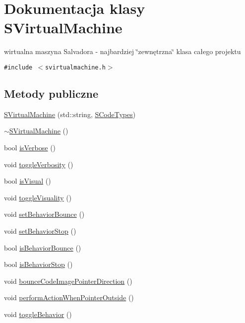 \hypertarget{classSVirtualMachine}{
\section{Dokumentacja klasy SVirtualMachine}
\label{classSVirtualMachine}
}
wirtualna maszyna Salvadora - najbardziej \char`\"{}zewnętrzna\char`\"{} klasa całego projektu  


{\tt \#include $<$svirtualmachine.h$>$}

\subsection*{Metody publiczne}
\begin{CompactItemize}
\item 
\hyperlink{classSVirtualMachine_020a4e9202a688dffed1e0d8951f9164}{SVirtualMachine} (std::string, \hyperlink{senums_8h_1a2ae45552936d27425f99e1c187b043}{SCodeTypes})
\item 
\hyperlink{classSVirtualMachine_eb727bcfdf05d45526920aa512988249}{$\sim$SVirtualMachine} ()
\item 
bool \hyperlink{classSVirtualMachine_38d1e09d68d418ce34ae46d6a9dbb6dd}{isVerbose} ()
\item 
void \hyperlink{classSVirtualMachine_d099907121223d24b1a599a3518cf3b0}{toggleVerbosity} ()
\item 
bool \hyperlink{classSVirtualMachine_e8c66ecac57d97346c24fd98c3736c2e}{isVisual} ()
\item 
void \hyperlink{classSVirtualMachine_ebee297cd2a5c3c572090315481e5024}{toggleVisuality} ()
\item 
void \hyperlink{classSVirtualMachine_0b29c76aa5023f0fe0b1237024ca5103}{setBehaviorBounce} ()
\item 
void \hyperlink{classSVirtualMachine_6d7c9f2fe223810123062d1c74ae542a}{setBehaviorStop} ()
\item 
bool \hyperlink{classSVirtualMachine_51a4d5a2dc91059e261135b150a78034}{isBehaviorBounce} ()
\item 
bool \hyperlink{classSVirtualMachine_9e4042e279737a419aa9200f8fe9f961}{isBehaviorStop} ()
\item 
void \hyperlink{classSVirtualMachine_0df11160e4aae2743ed39c65ea6d8441}{bounceCodeImagePointerDirection} ()
\item 
void \hyperlink{classSVirtualMachine_4d895936a3676ec3226383b3242be1af}{performActionWhenPointerOutside} ()
\item 
void \hyperlink{classSVirtualMachine_1d68dbb4416964707c818a550dcb10e9}{toggleBehavior} ()

\end{CompactItemize}
